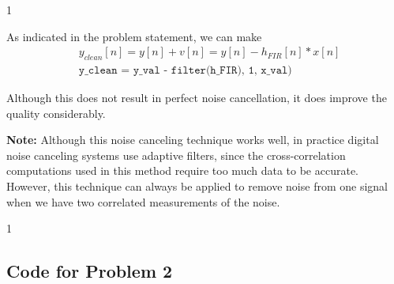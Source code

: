 \documentclass[10pt]{article}
\def\SOLUTIONS{1} %
\def\SolutionsColor{red2}
\begin{document}
\begin{description}
	\if\SOLUTIONS1 {\color{\SolutionsColor} As indicated in the problem statement, we can make
		\begin{align*}
			&y_{clean}[n] = y[n] + v[n] = y[n] - h_{FIR}[n]\ast x[n] \\
			&\texttt{y\_clean = y\_val - filter(h\_FIR), 1, x\_val)}
		\end{align*}
		
		Although this does not result in perfect noise cancellation, it does improve the quality considerably.
	}\fi

\end{description}

\textbf{Note:} Although this noise canceling technique works well, in practice digital noise canceling systems use adaptive filters, since the cross-correlation computations used in this method require too much data to be accurate. However, this technique can always be applied to remove noise from one signal when we have two correlated measurements of the noise.

\if\SOLUTIONS1 
	\subsection*{Code for Problem 2}
	
\fi
\end{document}
